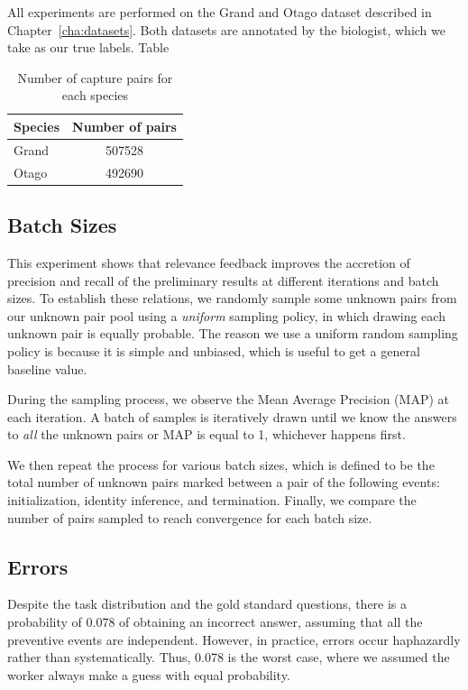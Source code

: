 All experiments are performed on the Grand and Otago dataset described in
Chapter~\ref{cha:datasets}. Both datasets are annotated by the biologist, which
we take as our true labels. Table 

\begin{table}[t]
\captionsetup{justification=centering}
  \caption{Number of capture pairs for each species}
  \label{tab:species_npairs} %
  \centering
  \begin{tabular}{lc}
    \toprule
    Species & Number of pairs \\
    \midrule
    Grand & 507528 \\
    Otago & 492690 \\
    \bottomrule
  \end{tabular}
\end{table}

\subsection{Batch Sizes} %
\label{sub:batch_sizes}

This experiment shows that relevance feedback improves the accretion of
precision and recall of the preliminary results at different iterations and
batch sizes. To establish these relations, we randomly sample some unknown
pairs from our unknown pair pool using a \emph{uniform} sampling policy, in which
drawing each unknown pair is equally probable. The reason we use a uniform random
sampling policy is because it is simple and unbiased, which is useful to get a
general baseline value.

During the sampling process, we observe the Mean Average Precision (MAP) at
each iteration. A batch of samples is iteratively drawn until we know the
answers to \emph{all} the unknown pairs or MAP is equal to 1, whichever happens
first.

We then repeat the process for various batch sizes, which is defined to be the
total number of unknown pairs marked between a pair of the following events:
initialization, identity inference, and termination. Finally, we compare the
number of pairs sampled to reach convergence for each batch size.

\subsection{Errors} %
\label{sub:errors}

Despite the task distribution and the gold standard questions, there is
a probability of 0.078 of obtaining an incorrect answer, assuming that all the
preventive events are independent. However, in practice, errors occur
haphazardly rather than systematically. Thus, 0.078 is the worst case, where we
assumed the worker always make a guess with equal probability.

